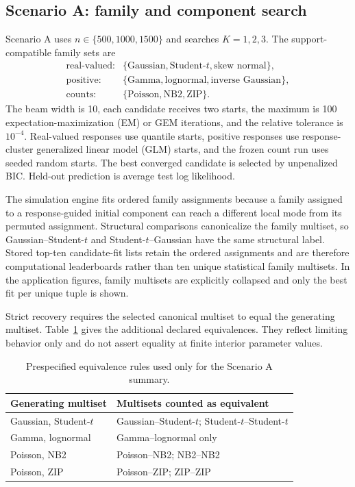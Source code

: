 \documentclass[a4paper,fleqn]{cas-sc}
\numberwithin{equation}{section}
\begin{document}
\subsection{Scenario A: family and component search}

Scenario A uses $n\in\{500,1000,1500\}$ and searches $K=1,2,3$. The support-compatible family sets are
\[
\begin{array}{ll}
\text{real-valued:}&\{\text{Gaussian},\text{Student-}t,\text{skew normal}\},\\
\text{positive:}&\{\text{Gamma},\text{lognormal},\text{inverse Gaussian}\},\\
\text{counts:}&\{\text{Poisson},\text{NB2},\text{ZIP}\}.
\end{array}
\]
The beam width is 10, each candidate receives two starts, the maximum is 100 expectation-maximization (EM) or GEM iterations, and the relative tolerance is $10^{-4}$. Real-valued responses use quantile starts, positive responses use response-cluster generalized linear model (GLM) starts, and the frozen count run uses seeded random starts. The best converged candidate is selected by unpenalized BIC. Held-out prediction is average test log likelihood.

The simulation engine fits ordered family assignments because a family assigned to a response-guided initial component can reach a different local mode from its permuted assignment. Structural comparisons canonicalize the family multiset, so Gaussian--Student-$t$ and Student-$t$--Gaussian have the same structural label. Stored top-ten candidate-fit lists retain the ordered assignments and are therefore computational leaderboards rather than ten unique statistical family multisets. In the application figures, family multisets are explicitly collapsed and only the best fit per unique tuple is shown.

Strict recovery requires the selected canonical multiset to equal the generating multiset. Table~\ref{supp:tab:equivalence} gives the additional declared equivalences. They reflect limiting behavior only and do not assert equality at finite interior parameter values.

\begin{table}[t]
\centering
\caption{Prespecified equivalence rules used only for the Scenario A summary.}
\label{supp:tab:equivalence}
\small
\begin{tabular}{ll}
\toprule
Generating multiset & Multisets counted as equivalent\\
\midrule
Gaussian, Student-$t$ & Gaussian--Student-$t$; Student-$t$--Student-$t$\\
Gamma, lognormal & Gamma--lognormal only\\
Poisson, NB2 & Poisson--NB2; NB2--NB2\\
Poisson, ZIP & Poisson--ZIP; ZIP--ZIP\\
\bottomrule
\end{tabular}
\end{table}
\end{document}
